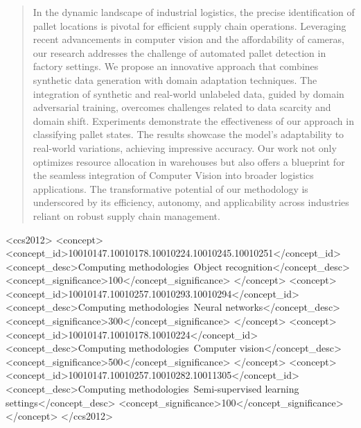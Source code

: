 \documentclass[sigconf,authordraft]{acmart}
\begin{document}
\begin{abstract}
    In the dynamic landscape of industrial logistics, the precise identification of pallet locations is pivotal for efficient supply chain operations. Leveraging recent advancements in computer vision and the affordability of cameras, our research addresses the challenge of automated pallet detection in factory settings. We propose an innovative approach that combines synthetic data generation with domain adaptation techniques. The integration of synthetic and real-world unlabeled data, guided by domain adversarial training, overcomes challenges related to data scarcity and domain shift. Experiments demonstrate the effectiveness of our approach in classifying pallet states. The results showcase the model's adaptability to real-world variations, achieving impressive accuracy. Our work not only optimizes resource allocation in warehouses but also offers a blueprint for the seamless integration of Computer Vision into broader logistics applications. The transformative potential of our methodology is underscored by its efficiency, autonomy, and applicability across industries reliant on robust supply chain management.
\end{abstract}

\begin{CCSXML}
<ccs2012>
   <concept>
       <concept_id>10010147.10010178.10010224.10010245.10010251</concept_id>
       <concept_desc>Computing methodologies~Object recognition</concept_desc>
       <concept_significance>100</concept_significance>
       </concept>
   <concept>
       <concept_id>10010147.10010257.10010293.10010294</concept_id>
       <concept_desc>Computing methodologies~Neural networks</concept_desc>
       <concept_significance>300</concept_significance>
       </concept>
   <concept>
       <concept_id>10010147.10010178.10010224</concept_id>
       <concept_desc>Computing methodologies~Computer vision</concept_desc>
       <concept_significance>500</concept_significance>
       </concept>
   <concept>
       <concept_id>10010147.10010257.10010282.10011305</concept_id>
       <concept_desc>Computing methodologies~Semi-supervised learning settings</concept_desc>
       <concept_significance>100</concept_significance>
       </concept>
 </ccs2012>
\end{CCSXML}
\end{document}
